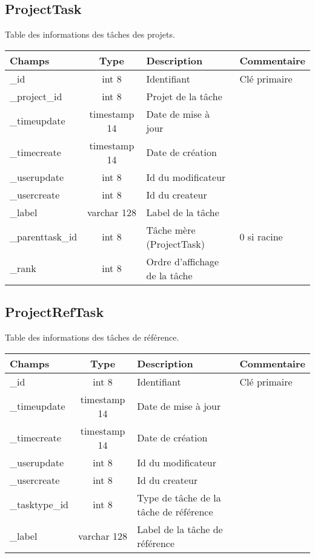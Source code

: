 \subsection{ProjectTask}
Table des informations des tâches des projets.\\

\begin{tabular}{|p{3cm}|c|p{5.4cm}|p{2.6cm}|}
\hline
\textbf{Champs} & \textbf{Type} & \textbf{Description} & \textbf{Commentaire} \\
\hline
\_id & int 8 & Identifiant & Clé primaire \\
\hline
\_project\_id & int 8 & Projet de la tâche & \\
\hline
\_timeupdate & timestamp 14 & Date de mise à jour & \\
\hline
\_timecreate & timestamp 14 & Date de création & \\
\hline
\_userupdate & int 8 & Id du modificateur & \\
\hline
\_usercreate & int 8 & Id du createur & \\
\hline
\_label & varchar 128 & Label de la tâche & \\
\hline
\_parenttask\_id & int 8 & Tâche mère (ProjectTask) & 0 si racine \\
\hline
\_rank & int 8 & Ordre d'affichage de la tâche & \\
\hline
\end{tabular}


\subsection{ProjectRefTask}
Table des informations des tâches de référence.\\

\begin{tabular}{|p{3cm}|c|p{5.4cm}|p{2.6cm}|}
\hline
\textbf{Champs} & \textbf{Type} & \textbf{Description} & \textbf{Commentaire} \\
\hline
\_id & int 8 & Identifiant & Clé primaire \\
\hline
\_timeupdate & timestamp 14 & Date de mise à jour & \\
\hline
\_timecreate & timestamp 14 & Date de création & \\
\hline
\_userupdate & int 8 & Id du modificateur & \\
\hline
\_usercreate & int 8 & Id du createur & \\
\hline
\_tasktype\_id & int 8 & Type de tâche de la tâche de référence & \\
\hline
\_label & varchar 128 & Label de la tâche de référence & \\
\hline
\end{tabular}


